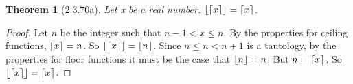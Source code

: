 \documentclass[a4paper, 12pt]{article}
\theoremstyle{plain}
\newtheorem*{theorem*}{Theorem}
\DeclarePairedDelimiter{\floor}{\lfloor}{\rfloor}
\DeclarePairedDelimiter{\ceil}{\lceil}{\rceil}
\begin{document}
	
	\begin{theorem*}[2.3.70a]
		Let x be a real number. $\floor{\ceil{x}} = \ceil{x}$.
	\end{theorem*}
	
	\begin{proof}
		Let $n$ be the integer such that $n - 1 < x \le n$. By the properties for ceiling 
		functions, $\ceil{x} = n$. So $\floor{\ceil{x}} = \floor{n}$. Since $n \le n < n + 1$ is 
		a tautology, by the properties for floor functions it must be the case that 
		$\floor{n} = n$. But $n = \ceil{x}$. So $\floor{\ceil{x}} = \ceil{x}$.
	\end{proof}
\end{document}
